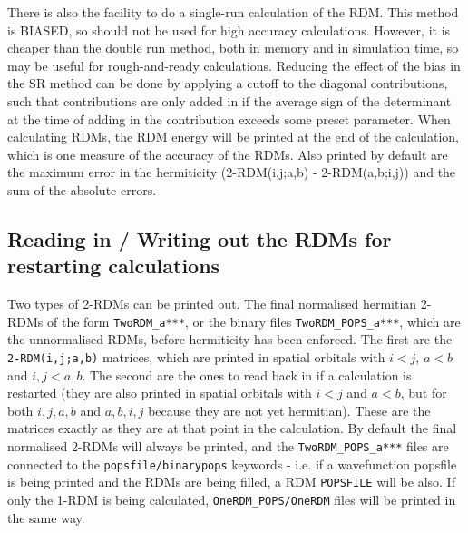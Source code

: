 \documentclass[a4paper,notitlepage,dvipsnames]{scrreprt}
\let\code\lstinline
\begin{document}
There is also the facility to do a single-run calculation of the RDM.  This method is BIASED, so should
not be used for high accuracy calculations.  However, it is cheaper than the double run method, both in
memory and in simulation time, so may be useful for rough-and-ready calculations.
Reducing the effect of the bias in the SR method can be done by applying a cutoff to the diagonal contributions, such that
contributions are only added in if the average sign of the determinant at the time of adding in the contribution exceeds
some preset parameter.
When calculating RDMs, the RDM energy will be printed at the end of the
calculation, which is one measure of the accuracy of the RDMs.  Also printed by default are the maximum error in the
    hermiticity (2-RDM(i,j;a,b) - 2-RDM(a,b;i,j)) and the sum of the absolute errors.

\subsection{Reading in / Writing out the RDMs for restarting calculations}

	Two types of 2-RDMs can be printed out.  The final normalised hermitian 2-RDMs of the form \code{TwoRDM_a***}, or the
	binary files \code{TwoRDM_POPS_a***}, which are the unnormalised RDMs, before hermiticity has been enforced.  The
	first are the \code{2-RDM(i,j;a,b)} matrices, which are printed in
    spatial orbitals with $i<j$, $a<b$ and $i,j<a,b$.  The second are the ones to read back in if a calculation
    is restarted (they are also printed in spatial orbitals with $i<j$ and $a<b$, but for both $i,j,a,b$ and $a,b,i,j$
    because they are not yet hermitian).  These are the matrices exactly as they are at that point in the calculation.
	By default the final normalised 2-RDMs will always be printed, and the \code{TwoRDM_POPS_a***} files are connected to the
    \code{popsfile/binarypops} keywords - i.e. if a wavefunction popsfile is being printed and the RDMs are being filled,
	a RDM \code{POPSFILE} will be also.
	If only the 1-RDM is being calculated, \code{OneRDM_POPS/OneRDM} files will be printed in the same way.
\end{document}
